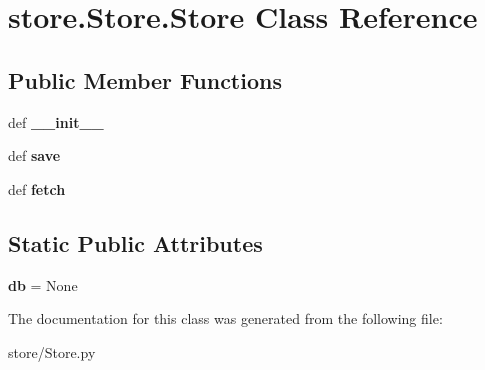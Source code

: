 \hypertarget{classstore_1_1_store_1_1_store}{\section{store.\-Store.\-Store Class Reference}
\label{classstore_1_1_store_1_1_store}
}
\subsection*{Public Member Functions}
\begin{DoxyCompactItemize}
\item 
\hypertarget{classstore_1_1_store_1_1_store_a21565b59a0c892d657e4c5ab97f43892}{def {\bfseries \-\_\-\-\_\-init\-\_\-\-\_\-}}\label{classstore_1_1_store_1_1_store_a21565b59a0c892d657e4c5ab97f43892}

\item 
\hypertarget{classstore_1_1_store_1_1_store_a47778a74e5abeee4a86908e36b90d1d7}{def {\bfseries save}}\label{classstore_1_1_store_1_1_store_a47778a74e5abeee4a86908e36b90d1d7}

\item 
\hypertarget{classstore_1_1_store_1_1_store_a7dc8b91e7ea924a40bdd365250f5ea9b}{def {\bfseries fetch}}\label{classstore_1_1_store_1_1_store_a7dc8b91e7ea924a40bdd365250f5ea9b}

\end{DoxyCompactItemize}
\subsection*{Static Public Attributes}
\begin{DoxyCompactItemize}
\item 
\hypertarget{classstore_1_1_store_1_1_store_a6754b91f4ccb0614f3b48695e60ecac8}{{\bfseries db} = None}\label{classstore_1_1_store_1_1_store_a6754b91f4ccb0614f3b48695e60ecac8}

\end{DoxyCompactItemize}


The documentation for this class was generated from the following file\-:\begin{DoxyCompactItemize}
\item 
store/Store.\-py\end{DoxyCompactItemize}

